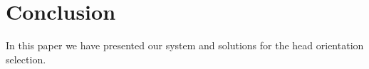 
\section{Conclusion}
\label{sec:conclusion}

In this paper we have presented our system and solutions for the head orientation selection.

